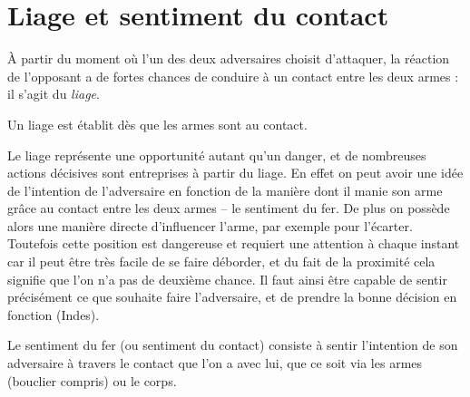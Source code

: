 \section{Liage et sentiment du contact}


À partir du moment où l'un des deux adversaires choisit d'attaquer, la réaction de l'opposant a de fortes chances de conduire à un contact entre les deux armes : il s'agit du \emph{liage}.


\begin{definition}[Liage]
	\label{conc:def:liage}

	Un liage est établit dès que les armes sont au contact.
\end{definition}


Le liage représente une opportunité autant qu'un danger, et de nombreuses actions décisives sont entreprises à partir du liage.
En effet on peut avoir une idée de l'intention de l'adversaire en fonction de la manière dont il manie son arme grâce au contact entre les deux armes -- le sentiment du fer.
De plus on possède alors une manière directe d'influencer l'arme, par exemple pour l'écarter.
Toutefois cette position est dangereuse et requiert une attention à chaque instant car il peut être très facile de se faire déborder, et du fait de la proximité cela signifie que l'on n'a pas de deuxième chance.
Il faut ainsi être capable de sentir précisément ce que souhaite faire l'adversaire, et de prendre la bonne décision en fonction (Indes).


\begin{definition}
	\label{conc:def:sentiment-fer}

	Le sentiment du fer (ou sentiment du contact) consiste à sentir l'intention de son adversaire à travers le contact que l'on a avec lui, que ce soit via les armes (bouclier compris) ou le corps.
\end{definition}


